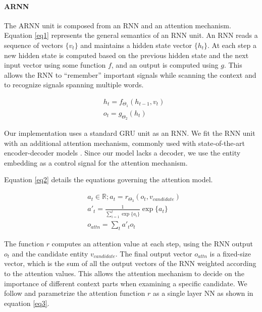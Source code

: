 \documentclass[11pt,a4paper]{article}
\begin{document}
	\paragraph{ARNN}
	The ARNN unit is composed from an RNN and an attention mechanism. Equation \ref{eq1} represents the general semantics of an RNN unit. An RNN reads a sequence of vectors $\{v_t\}$ and maintains a hidden state vector $\{h_t\}$. At each step a new hidden state is computed based on the previous hidden state and the next input vector using some function $f$, and an output is computed using $g$. This allows the RNN to ``remember'' important signals while scanning the context and to recognize signals spanning multiple words.
	
	\begin{equation}
	\label{eq1}
	\begin{aligned}
	& h_t=f_{\Theta_1}(h_{t-1}, v_t) \\
	& o_t=g_{\Theta_2}(h_t)
	\end{aligned}
	\end{equation}
	
	Our implementation uses a standard GRU unit \cite{cho2014learning} as an RNN. We fit the RNN unit with an additional attention mechanism, commonly used with state-of-the-art encoder-decoder models \cite{bahdanau2014neural,xu2015show}. Since our model lacks a decoder, we use the entity embedding as a control signal for the attention mechanism.
	
	Equation \ref{eq2} details the equations governing the attention model.
	
	\begin{equation}
	\label{eq2}
	\begin{aligned}
	& a_t \in \mathbb{R}; a_t=r_{\Theta_3}(o_t, v_{candidate}) \\
	& a'_t  = \frac{1}{\sum_{i=1}^{t} \exp\{a_i\}} \exp \{a_t\} \\
	& o_{attn}=\sum_{t} a'_t o_t
	\end{aligned}
	\end{equation}
	
	The function $r$ computes an attention value at each step, using the RNN output $o_t$ and the candidate entity $v_{candidate}$. The final output vector $o_{attn}$ is a fixed-size vector, which is the sum of all the output vectors of the RNN weighted according to the attention values. This allows the attention mechanism to decide on the importance of different context parts when examining a specific candidate. We follow  and parametrize the attention function $r$ as a single layer NN as shown in equation \ref{eq3}.
	
\end{document}
